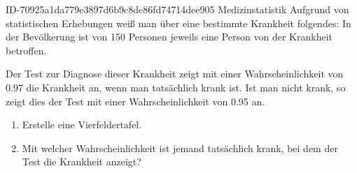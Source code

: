 \begin{exercise}
      {ID-70925a1da779e3897d6b9c8de86fd74714dee905}
      {Medizinstatistik}
  \ifproblem\problem
    Aufgrund von statistischen Erhebungen weiß man über eine bestimmte Krankheit
    folgendes: In der Bevölkerung ist von 150 Personen jeweils eine Person von
    der Krankheit betroffen.\par
    Der Test zur Diagnose dieser Krankheit zeigt mit einer Wahrscheinlichkeit von
    \num{0.97} die Krankheit an, wenn man tatsächlich krank ist. Ist man nicht
    krank, so zeigt dies der Test mit einer Wahrscheinlichkeit von \num{0.95} an.
    \begin{enumerate}
      \item Erstelle eine Vierfeldertafel.
      \item Mit welcher Wahrscheinlichkeit ist jemand tatsächlich krank,
            bei dem der Test die Krankheit anzeigt?
    \end{enumerate}
  \fi
\end{exercise}
